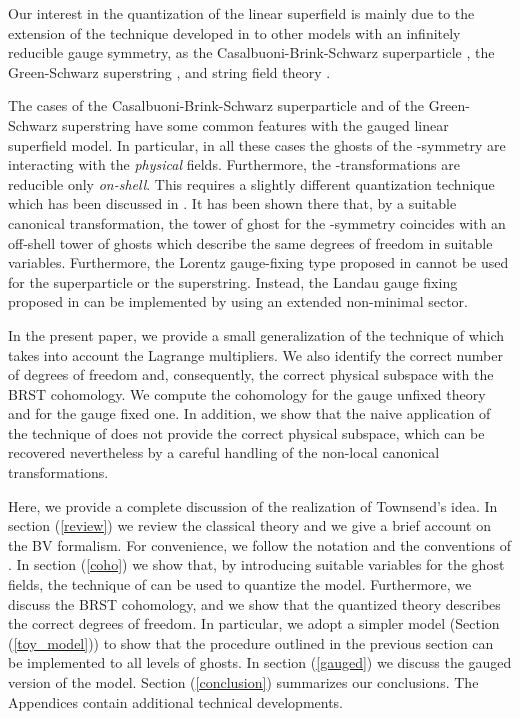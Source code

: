 \documentclass[a4paper,12pt]{article}
\begin{document}
Our interest in the quantization of the linear superfield is mainly
due to the extension of the technique developed in \cite{GPZ,PZ} 
to other models with an infinitely reducible gauge symmetry, as 
the Casalbuoni-Brink-Schwarz superparticle
\cite{Brink-Schwarz,Siegel:1983hh,Lindstrom_BS,GH_BS,superparticle},
the Green-Schwarz superstring
\cite{green3,hiddengh,GSST,bergshoeff,GH,Lindstrom}, and string
field theory \cite{SFT}. 

The cases of the Casalbuoni-Brink-Schwarz superparticle and of the
Green-Schwarz superstring have some common features with the gauged
linear superfield model. In particular, in all these cases the ghosts
of the \myHighlight{$\kappa$}\coordHE{}-symmetry \cite{Siegel:1983hh} are interacting with the
{\it physical} fields.  Furthermore, the \myHighlight{$\kappa$}\coordHE{}-transformations are
reducible only {\it on-shell}.  This requires a slightly different
quantization technique which has been discussed in \cite{porr_2}. It
has been shown there that, by a suitable canonical transformation, the
tower of ghost for the \myHighlight{$\kappa$}\coordHE{}-symmetry coincides with an off-shell
tower of ghosts which describe the same degrees of freedom in suitable
variables.  Furthermore, the Lorentz gauge-fixing type proposed in
\cite{GPZ,PZ} cannot be used for the superparticle or the superstring.
Instead, the Landau gauge fixing proposed in \cite{Lindstrom_BS} can
be implemented by using an extended non-minimal sector.

In the present paper, we provide a small generalization of the
technique of \cite{GPZ} which takes into account the Lagrange
multipliers. We also identify the correct number of degrees of freedom
and, consequently, the correct physical subspace with the BRST
cohomology. We
compute the cohomology for the gauge unfixed theory and for the gauge
fixed one. In addition, we show that the naive application of the
technique of \cite{GPZ} does not provide the correct physical
subspace, which can be recovered nevertheless by a careful handling of
the non-local canonical transformations.

Here, we provide a complete discussion of the realization of
Townsend's idea.  In section (\ref{review}) we review the classical
theory and we give a brief account on the BV formalism. For
convenience, we follow the notation and the conventions of \cite{GPZ}.
In section (\ref{coho}) we show that, by introducing suitable
variables for the ghost fields, the technique of \cite{GPZ} can be
used to quantize the model. Furthermore, we discuss the BRST cohomology, 
and we show that the quantized
theory describes the correct degrees of freedom. In particular, we
adopt a simpler model (Section (\ref{toy_model})) to show that the
procedure outlined in the previous section can be implemented to all
levels of ghosts. In section (\ref{gauged}) we discuss the gauged
version of the model. Section (\ref{conclusion}) summarizes our
conclusions. The Appendices contain additional technical developments.
\end{document}
